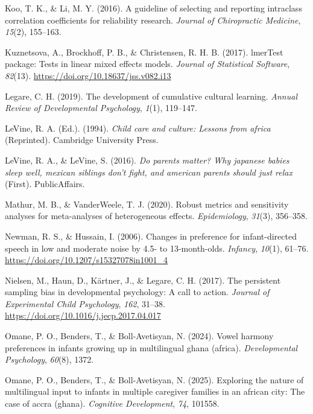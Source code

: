 \documentclass[
  english,
  ,man,floatsintext]{apa6}
\newlength{\cslhangindent}
\newenvironment{CSLReferences}[2] %
 {\begin{list}{}{%
  \setlength{\itemindent}{0pt}
  \setlength{\leftmargin}{0pt}
  \setlength{\parsep}{0pt}
  \ifodd #1
   \setlength{\leftmargin}{\cslhangindent}
   \setlength{\itemindent}{-1\cslhangindent}
  \fi
  \setlength{\itemsep}{#2\baselineskip}}}
 {\end{list}}
\begin{document}
\begin{CSLReferences}{1}{0}
Koo, T. K., \& Li, M. Y. (2016). A guideline of selecting and reporting intraclass correlation coefficients for reliability research. \emph{Journal of Chiropractic Medicine}, \emph{15}(2), 155--163.

Kuznetsova, A., Brockhoff, P. B., \& Christensen, R. H. B. (2017). lmerTest package: Tests in linear mixed effects models. \emph{Journal of Statistical Software}, \emph{82}(13). \url{https://doi.org/10.18637/jss.v082.i13}

Legare, C. H. (2019). The development of cumulative cultural learning. \emph{Annual Review of Developmental Psychology}, \emph{1}(1), 119--147.

LeVine, R. A. (Ed.). (1994). \emph{Child care and culture: Lessons from africa} (Reprinted). Cambridge University Press.

LeVine, R. A., \& LeVine, S. (2016). \emph{Do parents matter? Why japanese babies sleep well, mexican siblings don't fight, and american parents should just relax} (First). PublicAffairs.

Mathur, M. B., \& VanderWeele, T. J. (2020). Robust metrics and sensitivity analyses for meta-analyses of heterogeneous effects. \emph{Epidemiology}, \emph{31}(3), 356--358.

Newman, R. S., \& Hussain, I. (2006). Changes in preference for infant-directed speech in low and moderate noise by 4.5- to 13-month-olds. \emph{Infancy}, \emph{10}(1), 61--76. \url{https://doi.org/10.1207/s15327078in1001_4}

Nielsen, M., Haun, D., Kärtner, J., \& Legare, C. H. (2017). The persistent sampling bias in developmental psychology: A call to action. \emph{Journal of Experimental Child Psychology}, \emph{162}, 31--38. \url{https://doi.org/10.1016/j.jecp.2017.04.017}

Omane, P. O., Benders, T., \& Boll-Avetisyan, N. (2024). Vowel harmony preferences in infants growing up in multilingual ghana (africa). \emph{Developmental Psychology}, \emph{60}(8), 1372.

Omane, P. O., Benders, T., \& Boll-Avetisyan, N. (2025). Exploring the nature of multilingual input to infants in multiple caregiver families in an african city: The case of accra (ghana). \emph{Cognitive Development}, \emph{74}, 101558.


\end{CSLReferences}
\end{document}
